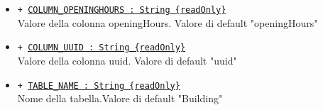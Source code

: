 \documentclass[../DefinizioneDiProdotto.tex]{subfiles}
\begin{document}
\begin{description}
\begin{itemize}
		\item \texttt{+ \underline{COLUMN\_OPENINGHOURS : String \{readOnly\}}}\\
		Valore della colonna openingHours. Valore di default "openingHours"
		
		\item \texttt{+ \underline{COLUMN\_UUID : String \{readOnly\}}}\\
		Valore della colonna uuid. Valore di default "uuid"
		
		\item \texttt{+ \underline{TABLE\_NAME : String \{readOnly\}}}\\
		Nome della tabella.Valore di default "Building"
		
	\end{itemize}
\end{description}
\end{document}
